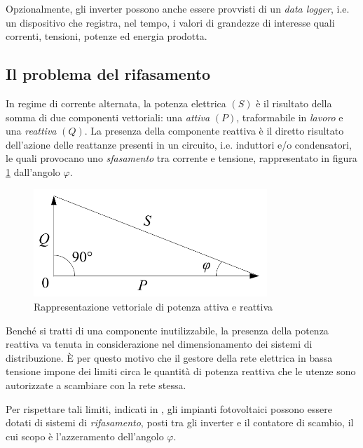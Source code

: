 %
Opzionalmente, gli inverter possono anche essere provvisti di un \emph{data logger}, 
i.e. un dispositivo che registra, nel tempo, i valori di grandezze di interesse quali 
correnti, tensioni, potenze ed energia prodotta.

%
\subsection{Il problema del rifasamento}
%
In regime di corrente alternata, la potenza elettrica $(S)$ \`e il risultato della 
somma di due componenti vettoriali: una \emph{attiva} $(P)$, traformabile in 
\emph{lavoro} e una \emph{reattiva} $(Q)$.
%
La presenza della componente reattiva \`e il diretto risultato dell'azione delle 
reattanze presenti in un circuito, i.e. induttori e/o condensatori, le quali 
provocano uno \emph{sfasamento} tra corrente e tensione, rappresentato in 
figura \ref{potenzaattivareattiva} dall'angolo $\varphi$.
%

%
\begin{figure}[!h]
\centering
\includegraphics[width=250pt]{img/apparent-power.png}
\caption{Rappresentazione vettoriale di potenza attiva e reattiva}
\label{potenzaattivareattiva}
\end{figure}
%
Bench\'e si tratti di una componente inutilizzabile, la presenza della potenza 
reattiva va tenuta in considerazione nel dimensionamento dei sistemi di 
distribuzione. \`E per questo motivo che il gestore della rete elettrica in 
bassa tensione impone dei limiti circa le quantit\`a di potenza reattiva 
che le utenze sono autorizzate a scambiare con la rete stessa.
%

%
Per rispettare tali limiti, indicati in \cite{criteriallacciamento}, gli impianti 
fotovoltaici possono essere dotati di sistemi di \emph{rifasamento}, posti 
tra gli inverter e il contatore di scambio, il cui scopo \`e l'azzeramento 
dell'angolo $\varphi$.
%

